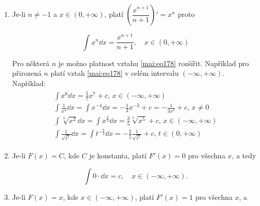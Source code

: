     \begin{enumerate}
      \item Je-li \(n\neq-1\) a \(x\in(0,+\infty)\), platí \(\left(\dfrac{x^{n+1}}{n+1}\right)'=
            x^n\) proto
            \begin{fleqn}[\parindent]
              \begin{equation}\label{mai:eq178}
                \int x^n\dd{x} = \dfrac{x^{n+1}}{n+1}, \quad x\in(0,+\infty) 
              \end{equation}
            \end{fleqn}  
            Pro některá \(n\) je možno platnost vztahu \ref{mai:eq178} rozšířit. Například pro
            přirozená \(n\) platí vztah \ref{mai:eq178} v celém intervalu \((-\infty,+\infty)\).
            Například: 
            \begin{gather*}
              \begin{flalign*}
                & \int x^6\dd{x}          
                  =  \frac{1}{7}x^7 + c, \, x\in(-\infty,+\infty)                            &   \\
                & \int\frac{1}{x^4}\dd{x} 
                  =  \int x^{-4}\dd{x} = -\frac{1}{3}x^{-3} + c 
                  = -\frac{1}{3x^3} + c,\, x\neq0                                            &   \\
                & \int\sqrt[3]{x^2}\dd{x} 
                  =  \int x^{\frac{2}{3}}\dd{x} 
                  = \frac{3}{5}\sqrt[3]{x^5} + c, \, x\in(-\infty,+\infty)                   &   \\
                & \int\frac{1}{\sqrt{t^7}}\dd{x} 
                  =  \int t^{-\frac{7}{2}}\dd{x} 
                  = -\frac{2}{5}\frac{1}{\sqrt{t^5}} + c,\, t\in(0,+\infty)                  & 
              \end{flalign*}
            \end{gather*}
      \item Je-li \(F(x)=C\), kde \(C\) je konstanta, platí \(F'(x)=0\) pro všechna \(x\), a tedy
            \begin{fleqn}[\parindent]
              \begin{equation*}
                \int 0\cdot\dd{x} = c, \quad x\in(-\infty,+\infty).
              \end{equation*}
            \end{fleqn}
      \item Je-li \(F(x)=x\), kde \(x\in(-\infty,+\infty)\), platí \(F'(x)=1\) pro všechna \(x\), a

\end{enumerate}
